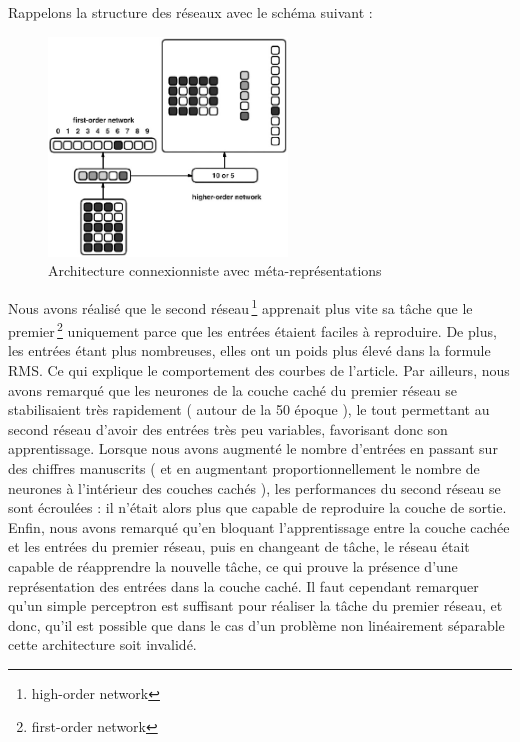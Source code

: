 \documentclass[a4paper,12pt]{article}
\begin{document}
Rappelons la structure des réseaux avec le schéma suivant :
\begin{figure}[h]
\begin{center}
 \includegraphics[width=240px]{../cleeremans_2007/digit_reco/digit_reco.png}
\end{center}
\caption{ \cite{Cleeremans_2007} Architecture connexionniste avec méta-représentations  }
\end{figure}

Nous avons réalisé que le second réseau\,\footnote{high-order network} apprenait 
plus vite sa tâche que le premier\,\footnote{first-order network}
uniquement parce que les entrées étaient faciles à reproduire. De plus, les entrées
étant plus nombreuses, elles ont un poids plus élevé dans la formule RMS. Ce qui 
explique le comportement des courbes de l'article.
\newline
Par ailleurs, nous avons remarqué que les neurones de la couche caché du premier
réseau se stabilisaient très rapidement ( autour de la 50 époque ), le tout
permettant au second réseau d'avoir des entrées très peu variables, favorisant donc son
apprentissage.
\newline
Lorsque nous avons 
augmenté le nombre d'entrées en passant sur des chiffres manuscrits ( et en 
augmentant proportionnellement le nombre de neurones à l'intérieur des couches
cachés ), les performances du second réseau se sont écroulées : il n'était alors
plus que capable de reproduire la couche de sortie.
\newline
Enfin, nous avons remarqué qu'en bloquant l'apprentissage entre la couche cachée et les 
entrées du premier réseau, puis en changeant de tâche, le réseau était capable de réapprendre
la nouvelle tâche, ce qui prouve la présence d'une représentation des entrées dans la couche 
caché.
\newline
\newline
Il faut cependant remarquer qu'un simple perceptron est suffisant pour réaliser la tâche
du premier réseau, et donc, qu'il est possible que dans le cas d'un problème non linéairement
séparable cette architecture soit invalidé.
\end{document}
